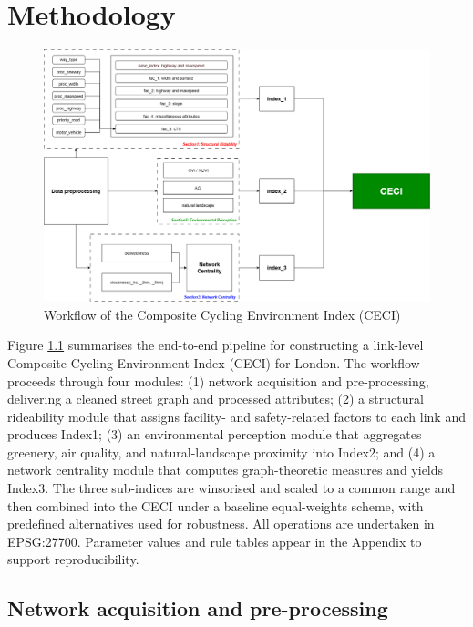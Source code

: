 \documentclass[
  12pt,
  oneside]{book}
\begin{document}
\chapter{Methodology}\label{methodology}

\begin{figure}

{\centering \includegraphics[width=1\linewidth]{general_images/flow} 

}

\caption{Workflow of the Composite Cycling Environment Index (CECI)}\label{fig:flow}
\end{figure}

Figure \ref{fig:flow} summarises the end-to-end pipeline for constructing a link-level Composite Cycling Environment Index (CECI) for London. The workflow proceeds through four modules: (1) network acquisition and pre-processing, delivering a cleaned street graph and processed attributes; (2) a structural rideability module that assigns facility- and safety-related factors to each link and produces Index1; (3) an environmental perception module that aggregates greenery, air quality, and natural-landscape proximity into Index2; and (4) a network centrality module that computes graph-theoretic measures and yields Index3. The three sub-indices are winsorised and scaled to a common range and then combined into the CECI under a baseline equal-weights scheme, with predefined alternatives used for robustness. All operations are undertaken in EPSG:27700. Parameter values and rule tables appear in the Appendix to support reproducibility.

\section{Network acquisition and pre-processing}\label{network-acquisition-and-pre-processing}
\end{document}
